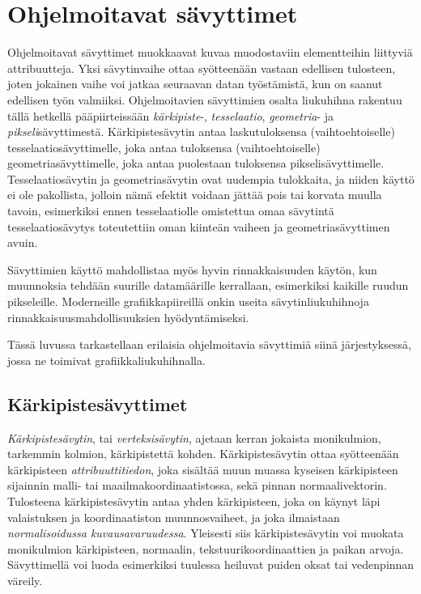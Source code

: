 \documentclass[finnish]{tktltiki2}
\theoremstyle{definition}
\theoremstyle{remark}
\begin{document}
\section{Ohjelmoitavat sävyttimet}

Ohjelmoitavat sävyttimet muokkaavat kuvaa muodostaviin elementteihin liittyviä attribuutteja. Yksi sävytinvaihe ottaa syötteenään vastaan edellisen tulosteen, joten jokainen vaihe voi jatkaa seuraavan datan työstämistä, kun on saanut edellisen työn valmiiksi. Ohjelmoitavien sävyttimien osalta liukuhihna rakentuu tällä hetkellä pääpiirteissään \emph{kärkipiste}-, \emph{tesselaatio}, \emph{geometria}- ja \emph{pikseli}sävyttimestä. Kärkipistesävytin antaa laskutuloksensa (vaihtoehtoiselle) tesselaatiosävyttimelle, joka antaa tuloksensa (vaihtoehtoiselle) geometriasävyttimelle, joka antaa puolestaan tuloksensa pikselisävyttimelle. Tesselaatiosävytin ja geometriasävytin ovat uudempia tulokkaita, ja niiden käyttö ei ole pakollista, jolloin nämä efektit voidaan jättää pois tai korvata muulla tavoin, esimerkiksi ennen tesselaatiolle omistettua omaa sävytintä tesselaatiosävytys toteutettiin oman kiinteän vaiheen ja geometriasävyttimen avuin.

Sävyttimien käyttö mahdollistaa myös hyvin rinnakkaisuuden käytön, kun muunnoksia tehdään suurille datamäärille kerrallaan, esimerkiksi kaikille ruudun pikseleille. Moderneille grafiikkapiireillä onkin useita sävytinliukuhihnoja rinnakkaisuusmahdollisuuksien hyödyntämiseksi.

Tässä luvussa tarkastellaan erilaisia ohjelmoitavia sävyttimiä siinä järjestyksessä, jossa ne toimivat grafiikkaliukuhihnalla.

\subsection{Kärkipistesävyttimet}

\emph{Kärkipistesävytin}, tai \emph{verteksisävytin}, ajetaan kerran jokaista monikulmion, tarkemmin kolmion, kärkipistettä kohden. Kärkipistesävytin ottaa syötteenään kärkipisteen \emph{attribuuttitiedon}, joka sisältää muun muassa kyseisen kärkipisteen sijainnin malli- tai maailmakoordinaatistossa, sekä pinnan normaalivektorin. Tulosteena kärkipistesävytin antaa yhden kärkipisteen, joka on käynyt läpi valaistuksen ja koordinaatiston muunnosvaiheet, ja joka ilmaistaan \emph{normalisoidussa kuvausavaruudessa}. Yleisesti siis kärkipistesävytin voi muokata monikulmion kärkipisteen, normaalin, tekstuurikoordinaattien ja paikan arvoja. Sävyttimellä voi luoda esimerkiksi tuulessa heiluvat puiden oksat tai vedenpinnan väreily.
\end{document}
